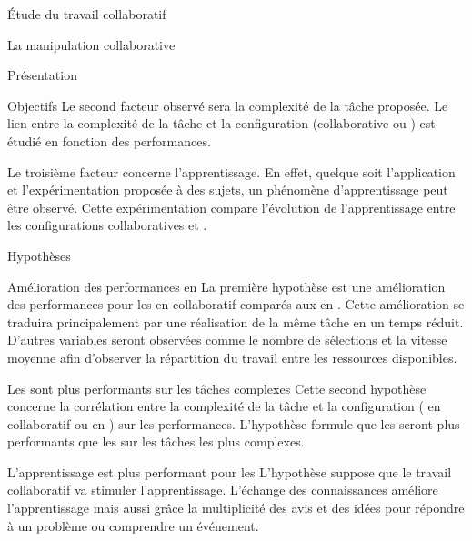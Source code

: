 \documentclass[myfrancais]{mythesis}
\begin{document}
\begin{mypart}{Étude du travail collaboratif}
\begin{mychapter}{La manipulation collaborative}
\begin{mysection}{Présentation}
\begin{mysubsection}{Objectifs}
					Le second facteur observé sera la complexité de la tâche proposée.
					Le lien entre la complexité de la tâche et la configuration (collaborative ou ) est étudié en fonction des performances.

					Le troisième facteur concerne l'apprentissage.
					En effet, quelque soit l'application et l'expérimentation proposée à des sujets, un phénomène d'apprentissage peut être observé.
					Cette expérimentation compare l'évolution de l'apprentissage entre les configurations collaboratives et .
				\end{mysubsection}
				\begin{mysubsection}{Hypothèses}
					\begin{myparagraph}{ Amélioration des performances en }
						La première hypothèse est une amélioration des performances pour les  en collaboratif comparés aux  en .
						Cette amélioration se traduira principalement par une réalisation de la même tâche en un temps réduit.
						D'autres variables seront observées comme le nombre de sélections et la vitesse moyenne afin d'observer la répartition du travail entre les ressources disponibles.
					\end{myparagraph}
					\begin{myparagraph}{ Les  sont plus performants sur les tâches complexes}
						Cette second hypothèse concerne la corrélation entre la complexité de la tâche et la configuration ( en collaboratif ou  en ) sur les performances.
						L'hypothèse formule que les  seront plus performants que les  sur les tâches les plus complexes.
					\end{myparagraph}
					\begin{myparagraph}{ L'apprentissage est plus performant pour les }
						L'hypothèse suppose que le travail collaboratif va stimuler l'apprentissage.
						L'échange des connaissances améliore l'apprentissage mais aussi grâce la multiplicité des avis et des idées pour répondre à un problème ou comprendre un événement.
					\end{myparagraph}
				\end{mysubsection}

\end{mysection}
\end{mychapter}
\end{mypart}
\end{document}
